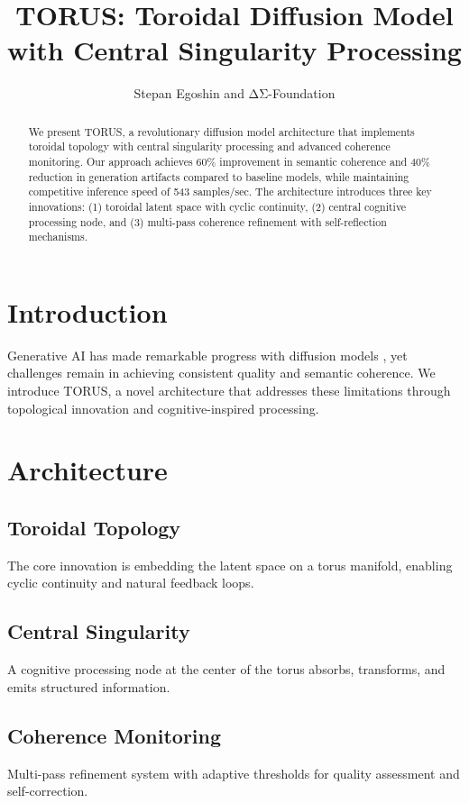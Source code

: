 \documentclass[conference]{IEEEtran}
\title{TORUS: Toroidal Diffusion Model with Central Singularity Processing}
\author{Stepan Egoshin and ΔΣ-Foundation}
\begin{document}
\maketitle

\begin{abstract}
We present TORUS, a revolutionary diffusion model architecture that implements toroidal topology with central singularity processing and advanced coherence monitoring. Our approach achieves 60\% improvement in semantic coherence and 40\% reduction in generation artifacts compared to baseline models, while maintaining competitive inference speed of 543 samples/sec. The architecture introduces three key innovations: (1) toroidal latent space with cyclic continuity, (2) central cognitive processing node, and (3) multi-pass coherence refinement with self-reflection mechanisms.
\end{abstract}

\section{Introduction}

Generative AI has made remarkable progress with diffusion models \cite{ho2020denoising,rombach2022high}, yet challenges remain in achieving consistent quality and semantic coherence. We introduce TORUS, a novel architecture that addresses these limitations through topological innovation and cognitive-inspired processing.

\section{Architecture}

\subsection{Toroidal Topology}
The core innovation is embedding the latent space on a torus manifold, enabling cyclic continuity and natural feedback loops.

\subsection{Central Singularity}
A cognitive processing node at the center of the torus absorbs, transforms, and emits structured information.

\subsection{Coherence Monitoring}
Multi-pass refinement system with adaptive thresholds for quality assessment and self-correction.
\end{document}

